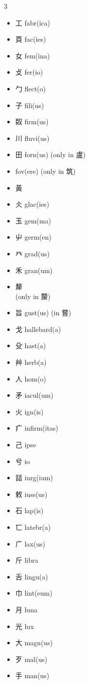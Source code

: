 \documentclass[xetex, svgnames, 12pt]{scrartcl}
\begin{document}
\begin{multicols}{3}
\begin{itemize}[noitemsep]
   \item 工 fabr(ica)
   \item 頁 fac(ies)
   \item 女 fem(ina) 
   \item 攴 fer(io) 
   \item 勹 flect(o)
   \item 子 fili(us) 
   \item 臤 firm(us)
   \item 川 fluvi(us)
   \item 田 forn(us) (only in 盧)
   \item {} fov(ere) (only in 筑)
   \item 黃   
   \item 仌 glac(ies)    
   \item 玉 gem(ma)
   \item 屮 germ(en)
   \item 癶 grad(us)
   \item 禾 gran(um) 
   \item 犛  \\ (only in 斄)
   \item 旨 gust(us) (in 嘗)
   \item 戈 hallebard(a) 
   \item 殳 hast(a)
   \item 艸 herb(a) 
   \item 人 hom(o) 
   \item 矛 iacul(um)
   \item 火 ign(is) 
   \item 疒 infirm(itas)
    \item 己 ipse
   \item 兮 io 
   \item 誩 iurg(ium)
   \item 敕 iuss(us)
   \item 石 lap(is)
   \item 匸 latebr(a)
   \item 广 lax(us) 
   \item 斤 libra 
   \item 舌 lingu(a)
   \item 巾 lint(eum) 
   \item 月 luna 
   \item 光 lux
   \item 大 magn(us) 
   \item 歹 mal(us) 
   \item 手 man(us) 

\end{itemize}
\end{multicols}
\end{document}
